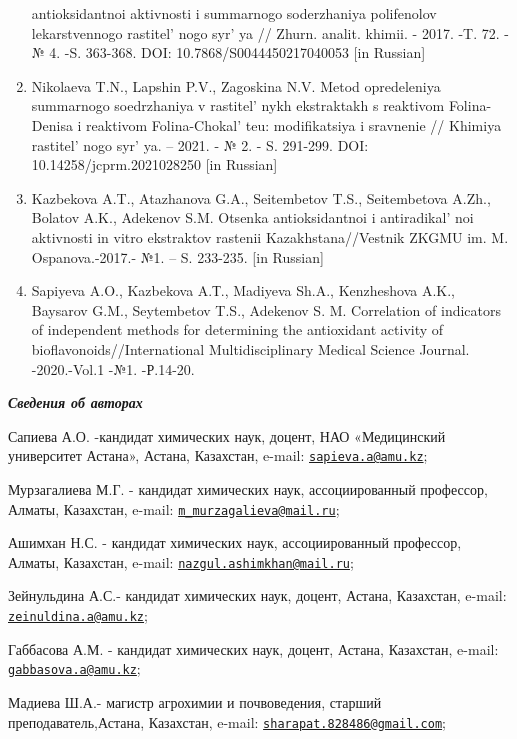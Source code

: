 \begin{enumerate}
  antioksidantnoi aktivnosti i summarnogo soderzhaniya polifenolov
  lekarstvennogo rastitel' nogo syr' ya //
  Zhurn. analit. khimii. - 2017. -T. 72. -№ 4. -S. 363-368. DOI:
  10.7868/S0044450217040053 {[}in Russian{]}
\item
  Nikolaeva T.N., Lapshin P.V., Zagoskina N.V. Metod opredeleniya
  summarnogo soedrzhaniya v rastitel' nykh ekstraktakh s
  reaktivom Folina-Denisa i reaktivom Folina-Chokal' teu:
  modifikatsiya i sravnenie // Khimiya rastitel' nogo
  syr' ya. -- 2021. - № 2. - S. 291-299. DOI:
  10.14258/jcprm.2021028250 {[}in Russian{]}
\item
  Kazbekova A.T., Atazhanova G.A., Seitembetov T.S., Seitembetova A.Zh.,
  Bolatov A.K., Adekenov S.M. Otsenka antioksidantnoi i
  antiradikal' noi aktivnosti in vitro ekstraktov
  rastenii Kazakhstana//Vestnik ZKGMU im. M. Ospanova.-2017.- №1. -- S.
  233-235. {[}in Russian{]}
\item
  Sapiyeva A.O., Kazbekova A.Т., Madiyeva Sh.A., Kenzheshova A.K.,
  Baysarov G.M., Seytembetov T.S., Adekenov S. M. Correlation of
  indicators of independent methods for determining the antioxidant
  activity of bioflavonoids//International Multidisciplinary Medical
  Science Journal. -2020.-Vol.1 -№1. -Р.14-20.
\end{enumerate}

\emph{{\bfseries Сведения об авторах}}

Сапиева А.О. -кандидат химических наук, доцент, НАО «Медицинский
университет Астана», Астана, Казахстан, e-mail:
\href{mailto:sapieva.a@amu.kz}{\nolinkurl{sapieva.a@amu.kz}};

Мурзагалиева М.Г. - кандидат химических наук, ассоциированный профессор,
Алматы, Казахстан, e-mail:
\href{mailto:m_murzagalieva@mail.ru}{\nolinkurl{m\_murzagalieva@mail.ru}};

Ашимхан Н.С. - кандидат химических наук, ассоциированный профессор,
Алматы, Казахстан, e-mail:
\href{mailto:nazgul.ashimkhan@mail.ru}{\nolinkurl{nazgul.ashimkhan@mail.ru}};

Зейнульдина А.С.- кандидат химических наук, доцент, Астана, Казахстан,
e-mail:
\href{mailto:zeinuldina.a@amu.kz}{\nolinkurl{zeinuldina.a@amu.kz}};

Габбасова А.М. - кандидат химических наук, доцент, Астана, Казахстан,
e-mail:
\href{mailto:gabbasova.a@amu.kz}{\nolinkurl{gabbasova.a@amu.kz}};

Мадиева Ш.А.- магистр агрохимии и почвоведения, старший
преподаватель,Астана, Казахстан, e-mail:
\href{mailto:sharapat.828486@gmail.com}{\nolinkurl{sharapat.828486@gmail.com}};

